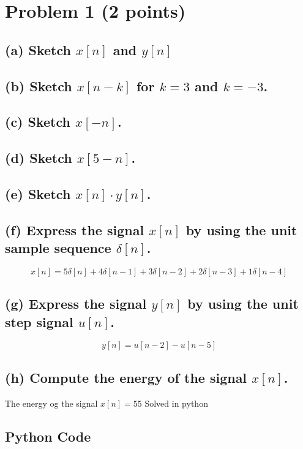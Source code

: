 \section{Problem 1 (2 points)}

\subsection*{(a) Sketch \( x[n] \) and \( y[n] \)}

\subsection*{(b) Sketch \( x[n-k] \) for \( k=3 \) and \( k=-3 \).}

\subsection*{(c) Sketch \( x[-n] \).}

\subsection*{(d) Sketch \( x[5-n] \).}

\subsection*{(e) Sketch \( x[n] \cdot y[n] \).}

\subsection*{(f) Express the signal \( x[n] \) by using the unit sample sequence \( \delta[n] \).}

\begin{equation*}
    x[n] = 5\delta[n] + 4\delta[n-1] + 3\delta[n-2] + 2\delta[n-3] + 1\delta[n-4]
\end{equation*}


\subsection*{(g) Express the signal \( y[n] \) by using the unit step signal \( u[n] \).}

\begin{equation*}
    y[n] = u[n-2] - u[n-5]
\end{equation*}


\subsection*{(h) Compute the energy of the signal \( x[n] \).}
The energy og the signal $x[n] =  55$ Solved in python

\subsection*{Python Code}


